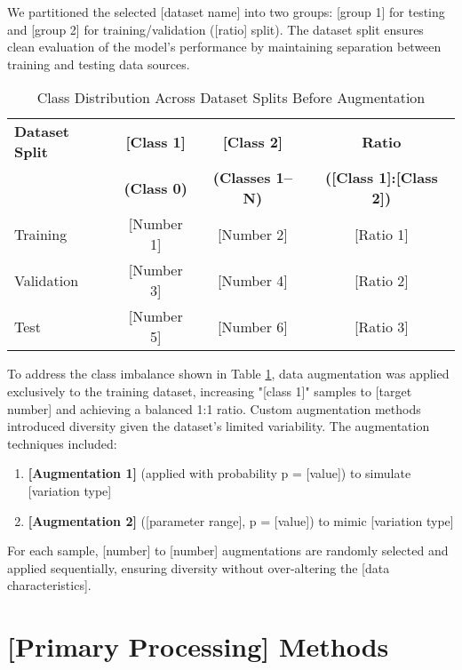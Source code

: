 We partitioned the selected [dataset name] into two groups: [group 1] for testing and [group 2] for training/validation ([ratio] split). The dataset split ensures clean evaluation of the model's performance by maintaining separation between training and testing data sources.

\begin{table}[htbp]
\caption{Class Distribution Across Dataset Splits Before Augmentation}
\label{tab:class_distribution}
\begin{tabular}{|l|c|c|c|}
\hline
\textbf{Dataset Split} & \textbf{[Class 1]} & \textbf{[Class 2]} & \textbf{Ratio} \\
& \textbf{(Class 0)} & \textbf{(Classes 1–N)} & \textbf{([Class 1]:[Class 2])} \\
\hline
Training & [Number 1] & [Number 2] & [Ratio 1] \\
Validation & [Number 3] & [Number 4] & [Ratio 2] \\
Test & [Number 5] & [Number 6] & [Ratio 3] \\
\hline
\end{tabular}
\end{table}

To address the class imbalance shown in Table \ref{tab:class_distribution}, data augmentation was applied exclusively to the training dataset, increasing "[class 1]" samples to [target number] and achieving a balanced 1:1 ratio. Custom augmentation methods introduced diversity given the dataset's limited variability. The augmentation techniques included:

\begin{enumerate}
\item \textbf{[Augmentation 1]} (applied with probability p = [value]) to simulate [variation type]
\item \textbf{[Augmentation 2]} ([parameter range], p = [value]) to mimic [variation type]
\end{enumerate}

For each sample, [number] to [number] augmentations are randomly selected and applied sequentially, ensuring diversity without over-altering the [data characteristics].

\section{[Primary Processing] Methods}

